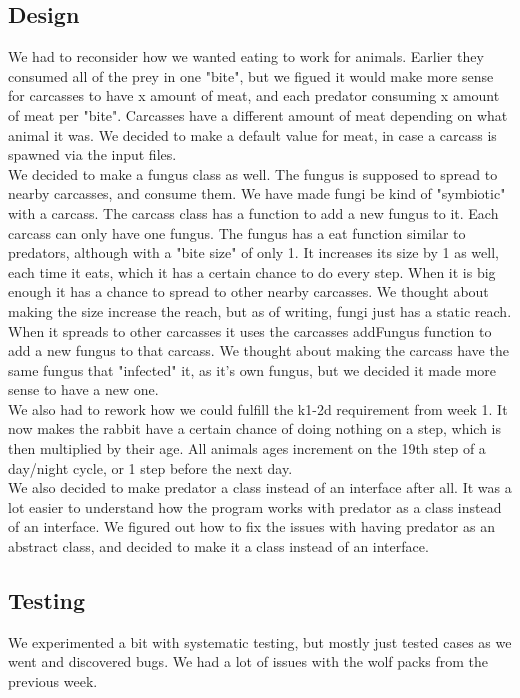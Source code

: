 \documentclass[11pt]{article}
\begin{document}
    \subsection*{Design}
    We had to reconsider how we wanted eating to work for animals. Earlier they consumed all of the prey in one "bite", but we figued it would 
    make more sense for carcasses to have x amount of meat, and each predator consuming x amount of meat per "bite". Carcasses have a different 
    amount of meat depending on what animal it was. We decided to make a default value for meat, in case a carcass is spawned via the input files. 
    \\
    We decided to make a fungus class as well. The fungus is supposed to spread to nearby carcasses, and consume them. 
    We have made fungi be kind of "symbiotic" with a carcass. The carcass class has a function to add a new fungus to it. Each carcass can only 
    have one fungus. The fungus has a eat function similar to predators, although with a "bite size" of only 1. It increases its size 
    by 1 as well, each time it eats, which it has a certain chance to do every step. When it is big enough it has a chance to spread to 
    other nearby carcasses. We thought about making the size increase the reach, but as of writing, fungi just has a static reach. 
    When it spreads to other carcasses it uses the carcasses addFungus function to add a new fungus to that carcass. 
    We thought about making the carcass have the same fungus that "infected" it, as it's own fungus, but we decided it made more 
    sense to have a new one. 
    \\
    We also had to rework how we could fulfill the k1-2d requirement from week 1. It now makes the rabbit have a certain chance of 
    doing nothing on a step, which is then multiplied by their age. 
    All animals ages increment on the 19th step of a day/night cycle, or 1 step before the next day. 
    \\
    We also decided to make predator a class instead of an interface after all. It was a lot easier to understand how the program works 
    with predator as a class instead of an interface. We figured out how to fix the issues with having predator as an abstract class, 
    and decided to make it a class instead of an interface. 
    \subsection*{Testing}
    We experimented a bit with systematic testing, but mostly just tested cases as we went and discovered bugs. 
    We had a lot of issues with the wolf packs from the previous week. 
    \newpage
\end{document}
